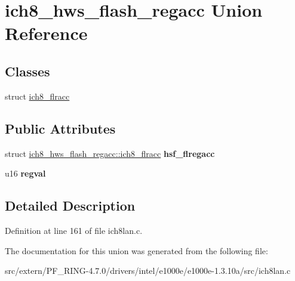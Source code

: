 \hypertarget{unionich8__hws__flash__regacc}{
\section{ich8\_\-hws\_\-flash\_\-regacc Union Reference}
\label{unionich8__hws__flash__regacc}
}
\subsection*{Classes}
\begin{DoxyCompactItemize}
\item 
struct \hyperlink{structich8__hws__flash__regacc_1_1ich8__flracc}{ich8\_\-flracc}
\end{DoxyCompactItemize}
\subsection*{Public Attributes}
\begin{DoxyCompactItemize}
\item 
\hypertarget{unionich8__hws__flash__regacc_acd06196a0acbbafc95b7ca081a2b0963}{
struct \hyperlink{structich8__hws__flash__regacc_1_1ich8__flracc}{ich8\_\-hws\_\-flash\_\-regacc::ich8\_\-flracc} {\bfseries hsf\_\-flregacc}}
\label{unionich8__hws__flash__regacc_acd06196a0acbbafc95b7ca081a2b0963}

\item 
\hypertarget{unionich8__hws__flash__regacc_a231de436106c33af5e64e881accc127d}{
u16 {\bfseries regval}}
\label{unionich8__hws__flash__regacc_a231de436106c33af5e64e881accc127d}

\end{DoxyCompactItemize}


\subsection{Detailed Description}


Definition at line 161 of file ich8lan.c.



The documentation for this union was generated from the following file:\begin{DoxyCompactItemize}
\item 
src/extern/PF\_\-RING-\/4.7.0/drivers/intel/e1000e/e1000e-\/1.3.10a/src/ich8lan.c\end{DoxyCompactItemize}
